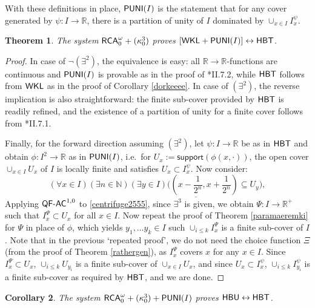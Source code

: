 \documentclass[reqno]{amsart}
\newtheorem{thm}{Theorem}
\newtheorem{cor}[thm]{Corollary}
\newcommand\be{\begin{equation}}
\newcommand\ee{\end{equation}}
\def\RCA{\textup{\textsf{RCA}}}
\def\WKL{\textup{\textsf{WKL}}}
\def\N{{\mathbb  N}}
\def\R{{\mathbb  R}}
\def\di{\rightarrow}
\def\asa{\leftrightarrow}
\def\PUNI{\textup{\textsf{PUNI}}}
\def\QFAC{\textup{\textsf{QF-AC}}}
\def\HBU{\textup{\textsf{HBU}}}
\def\HBT{\textup{\textsf{HBT}}}
\numberwithin{equation}{section}
\numberwithin{thm}{section}
\begin{document}
\smallskip

With these definitions in place, $\PUNI(I)$ is the statement that for any cover generated by $\psi:I\di \R$,  there is a partition of unity of $I$ dominated by $\cup_{x\in I}I_{x}^{\psi}$.
\begin{thm}\label{kokken3}
The system $\RCA_{0}^{\omega}+(\kappa_{0}^{3})$ proves $[\WKL+\PUNI(I)]\asa \HBT$.
\end{thm}
\begin{proof}
In case of $\neg(\exists^{2})$, the equivalence is easy: all $\R\di \R$-functions are continuous and $\PUNI(I)$ is provable as in the proof of \cite{simpson2}*{II.7.2}, while $\HBT$ follows from $\WKL$ as in the proof of Corollary \ref{dorkeeee}. 
In case of $(\exists^{2})$, the reverse implication is also straightforward: the finite sub-cover provided by $\HBT$ is readily refined, and the existence of a partition 
of unity for a finite cover follows from \cite{simpson2}*{II.7.1}. 

\smallskip

Finally, for the forward direction assuming $(\exists^{2})$, let $\psi:I\di \R$ be as in $\HBT$ and obtain $\phi:I^{2}\di \R$ as in $\PUNI(I)$, i.e.\ for $U_{x}:=\textsf{support}(\phi(x, \cdot))$, 
the open cover $\cup_{x\in I }U_{x}$ of $I$ is locally finite and satisfies $U_{x}\subset I_{x}^{\psi}$.  Now consider:
\be\label{centrifuge2555}\textstyle
(\forall x\in I)(\exists n\in \N)\underline{(\exists y\in I)\big((x-\frac{1}{2^{n}}, x+\frac{1}{2^{n}})\subseteq U_{y}\big)}, 
\ee
Applying $\QFAC^{1,0}$ to \eqref{centrifuge2555}, since $\exists^{3}$ is given, we obtain $\Psi:I\di \R^{+}$ such that $I_{x}^{\Psi}\subset U_{x}$ for all $x\in I$. 
Now repeat the proof of Theorem \ref{paramaeremki} for $\Psi$ in place of $\phi$, which  yields $y_{1},\dots y_{k}\in I$ such  $\cup_{i\leq k }I_{x}^{\Psi}$ is a finite sub-cover of $I$.  
Note that in the previous `repeated proof', we do not need the choice function $\Xi$ (from the proof of Theorem \ref{rathergen}), as $I_{x}^{\Psi}$ covers $x$ for any $x\in I$.  
Since $I_{x}^{\Psi}\subset U_{x}$, $\cup_{i\leq k }U_{y_{i}}$ is a finite sub-cover of $\cup_{x\in I}U_{x}$, and since $U_{x}\subset I_{x}^{\psi}$, $\cup_{i\leq k }I_{y_{i}}^{\psi}$ is a finite sub-cover as required by $\HBT$, and we are done. 
\end{proof}
\begin{cor}\label{kokken322}
The system $\RCA_{0}^{\omega}+(\kappa_{0}^{3})+\PUNI(I)$ proves $\HBU\asa \HBT$.
\end{cor}
\end{document}
